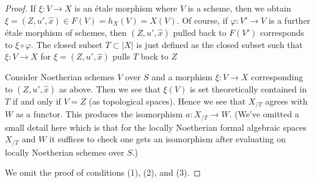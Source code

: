 \documentclass{stacks-project}
\theoremstyle{plain}
\theoremstyle{definition}
\theoremstyle{remark}
\numberwithin{equation}{subsection}
\begin{document}
\begin{proof}
\medskip\noindent
If $\xi : V \to X$ is an \'etale morphism where $V$ is a scheme, then
we obtain $\xi = (Z, u', \hat x) \in F(V) = h_X(V) = X(V)$.
Of course, if $\varphi : V' \to V$ is a further \'etale morphism of schemes,
then $(Z, u', \hat x)$ pulled back to $F(V')$ corresponds to
$\xi \circ \varphi$.
The closed subset $T \subset |X|$ is just defined as the closed
subset such that $\xi : V \to X$ for $\xi = (Z, u', \hat x)$
pulls $T$ back to $Z$

\medskip\noindent
Consider Noetherian schemes $V$ over $S$ and a morphism
$\xi : V \to X$ corresponding to $(Z, u', \hat x)$ as above.
Then we see that $\xi(V)$ is set theoretically contained in $T$
if and only if $V = Z$ (as topological spaces). Hence we see that
$X_{/T}$ agrees with $W$ as a functor. This produces the isomorphism
$a : X_{/T} \to W$. (We've omitted a small detail here which is
that for the locally Noetherian formal algebraic spaces $X_{/T}$ and
$W$ it suffices to check one gets an isomorphism after evaluating
on locally Noetherian schemes over $S$.)

\medskip\noindent
We omit the proof of conditions (1), (2), and (3).
\end{proof}
\end{document}
